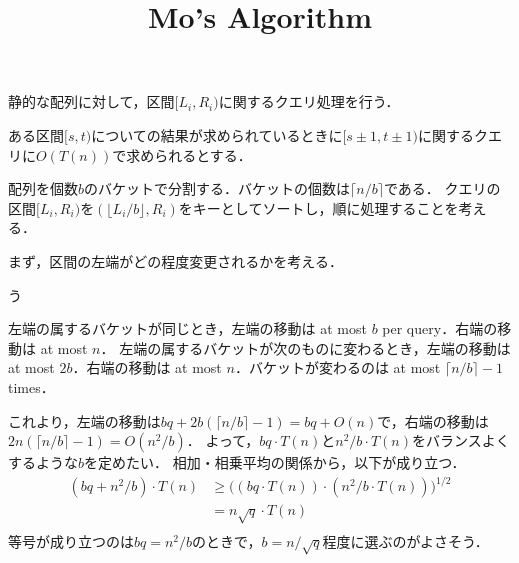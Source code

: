 \documentclass{jsarticle}
\title{Mo's Algorithm}
\newcommand{\floor}[1]{\lfloor #1\rfloor}
\newcommand{\ceil}[1]{\lceil #1\rceil}
\begin{document}
\maketitle

静的な配列に対して，区間$[L_i, R_i)$に関するクエリ処理を行う．
\iffalse
]\fi
ある区間$[s, t)$についての結果が求められているときに$[s\pm1, t\pm1)$に関するクエリに$O(T(n))$で求められるとする．
\iffalse
]]\fi

配列を個数$b$のバケットで分割する．バケットの個数は$\ceil{n/b}$である．
クエリの区間$[L_i, R_i)$を$(\floor{L_i/b}, R_i)$をキーとしてソートし，順に処理することを考える．
\iffalse
]\fi

まず，区間の左端がどの程度変更されるかを考える．

う

左端の属するバケットが同じとき，左端の移動は at most $b$ per query．右端の移動は at most $n$．
左端の属するバケットが次のものに変わるとき，左端の移動は at most $2b$．右端の移動は at most $n$．バケットが変わるのは at most $\ceil{n/b}-1$ times．

これより，左端の移動は$bq + 2b(\ceil{n/b}-1) = bq+O(n)$で，右端の移動は$2n(\ceil{n/b}-1) = O(n^2/b)$．
よって，$bq\cdot T(n)$と$n^2/b\cdot T(n)$をバランスよくするような$b$を定めたい．
相加・相乗平均の関係から，以下が成り立つ．
\begin{align*}
  (bq+n^2/b)\cdot T(n)
  &\ge \big((bq\cdot T(n))\cdot(n^2/b\cdot T(n))\big)^{1/2}\\
  &= n\sqrt q\cdot T(n)\\
\end{align*}
等号が成り立つのは$bq=n^2/b$のときで，$b=n/\sqrt{q}$程度に選ぶのがよさそう．
\end{document}

